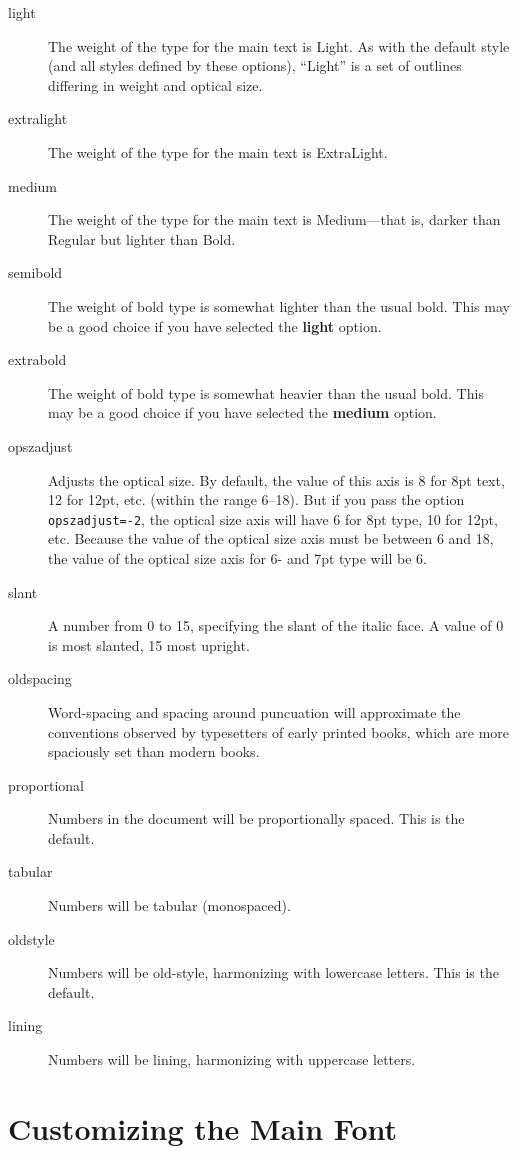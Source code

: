 \documentclass[12pt]{article}
\begin{document}
\begin{description}
    \item[light] The weight of the type for the main text is Light. As with the default
    style (and all styles defined by these options), “Light” is a set of outlines differing
    in weight and optical size.
    \item[extralight] The weight of the type for the main text is ExtraLight.
    \item[medium] The weight of the type for the main text is Medium---that is, darker than
    Regular but lighter than Bold.
    \item[semibold] The weight of bold type is somewhat lighter than the usual bold. This may be a
    good choice if you have selected the \textbf{light} option.
    \item[extrabold] The weight of bold type is somewhat heavier than the usual bold. This may be a
    good choice if you have selected the \textbf{medium} option.
    \item[opszadjust] Adjusts the optical size. By default, the value of this axis
    is 8 for 8pt text, 12 for 12pt, etc. (within the range 6–18). But if you pass the
    option {\verb|opszadjust=-2|}, the optical size axis will have 6 for 8pt type, 10 for
    12pt, etc. Because the value of the optical size axis must be between 6 and 18, the
    value of the optical size axis for 6- and 7pt type will be 6.
    \item[slant] A number from 0 to 15, specifying the slant of the italic face.
    A value of 0 is {\mostslanted most slanted}, 15 {\leastslanted most upright}.
    \item[oldspacing] Word-spacing and spacing around puncuation will approximate the conventions
    observed by typesetters of early printed books, which are more spaciously set than
    modern books.
    \item[proportional] Numbers in the document will be proportionally spaced. This is the default.
    \item[tabular] Numbers will be tabular (monospaced).
    \item[oldstyle] Numbers will be old-style, harmonizing with lowercase letters. This is the default.
    \item[lining] Numbers will be lining, harmonizing with uppercase letters.
\end{description}

\section{Customizing the Main Font}
\end{document}

